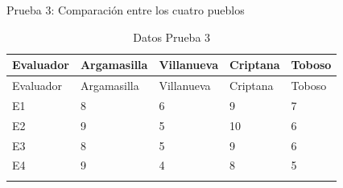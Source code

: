 \documentclass[
  ignorenonframetext,
]{beamer}
\begin{document}
\begin{frame}
\begin{block}{Prueba 3: Comparación entre los cuatro pueblos}
\label{sec-prueba3}
\begin{longtable}[]{@{}lllll@{}}
\caption{Datos Prueba 3}\label{tbl-prueba3}\tabularnewline
\toprule\noalign{}
Evaluador & Argamasilla & Villanueva & Criptana & Toboso \\
\midrule\noalign{}
\endfirsthead
\toprule\noalign{}
Evaluador & Argamasilla & Villanueva & Criptana & Toboso \\
\midrule\noalign{}
\endhead
E1 & 8 & 6 & 9 & 7 \\
E2 & 9 & 5 & 10 & 6 \\
E3 & 8 & 5 & 9 & 6 \\
E4 & 9 & 4 & 8 & 5 \\
\bottomrule\noalign{}
\end{longtable}
\end{block}
\end{frame}
\end{document}

